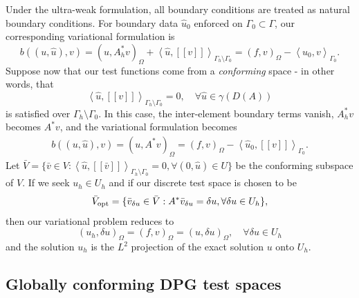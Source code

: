 \documentclass[11pt,onecolumn]{scrartcl}
\newcommand{\LRp}[1]{\left( #1 \right)}
\newcommand{\LRs}[1]{\left[ #1 \right]}
\newcommand{\LRa}[1]{\left\langle #1 \right\rangle}
\newcommand{\jump}[1] {\ensuremath{\LRs{\!\left[#1\right]\!}}}
\newcommand{\uh}{\widehat{u}}
\newcommand{\Gh}{\Gamma_h}
\begin{document}
Under the ultra-weak formulation, all boundary conditions are treated as natural boundary conditions.  For boundary data $\uh_0$ enforced on $\Gamma_0 \subset \Gamma$, our corresponding variational formulation is 
\begin{equation*}
b\LRp{\LRp{u,\uh},v} = \LRp{u,A_h^*v}_{\Omega} + \LRa{\uh,\jump{v}}_{\Gh \setminus \Gamma_0} = \LRp{f,v}_{\Omega} - \LRa{\widehat{u}_0,v}_{\Gamma_0}.
\end{equation*}
Suppose now that our test functions come from a \textit{conforming} space - in other words, that
\[
\LRa{\uh,\jump{v}}_{\Gh\setminus \Gamma_0} = 0, \quad \forall \uh \in \gamma(D(A))
\]
is satisfied over $\Gh\setminus \Gamma_0$.  
In this case, the inter-element boundary terms vanish, $A^*_h v$ becomes $A^*v$, and the variational formulation becomes
\begin{align*}
b\LRp{\LRp{u,\uh},v} = \LRp{u,A^*v}_{\Omega} = \LRp{f,v}_{\Omega} - \LRa{\widehat{u}_0,\jump{v}}_{\Gamma_0}.
\end{align*}
Let $\bar{V} = \{\bar{v}\in V: \LRa{\uh,\jump{\bar{v}}}_{\Gh\setminus\Gamma_0} = 0, \forall \LRp{0,\uh}\in U\}$ be the conforming subspace of $V$.  If we seek $u_h \in U_h$ and if our discrete test space is chosen to be 
\[
\bar{V}_{\rm opt} = \{\bar{v}_{\delta u} \in \bar{V}: A^*\bar{v}_{\delta u} = \delta u, \forall \delta u \in U_h\},
\]
then our variational problem reduces to
\[
\LRp{u_h,\delta u}_{\Omega} = \LRp{f,v}_{\Omega} = \LRp{u,\delta u}_{\Omega}, \quad \forall \delta u \in U_h
\]
and the solution $u_h$ is the $L^2$ projection of the exact solution $u$ onto $U_h$. 

\subsection{Globally conforming DPG test spaces}
\end{document}
